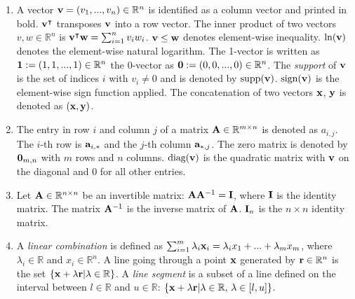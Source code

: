 \begin{enumerate}
    
    \item A vector $\bold{v} = (v_1, ..., v_n) \in \mathbb{R}^n$ is identified as a column vector and printed in bold. $\bold v^\intercal$ transposes $\bold v$ into a row vector. The inner product of two vectors $v, w \in \mathbb{R}^n$ is $\bold v^\intercal \bold w = \sum_{i=1}^n v_i w_i$. $\bold v \leq \bold w$ denotes element-wise inequality. $\ln (\bold v)$ denotes the element-wise natural logarithm. 
    The 1-vector is written as $\bold 1 := (1, 1, ..., 1) \in \mathbb{R}^n$ the 0-vector as $\bold 0 := (0, 0, ..., 0) \in \mathbb{R}^n$. The \textit{support} of $\bold{v}$ is the set of indices $i$ with $v_i \neq 0$ and is denoted by $\text{supp}(\bold v)$. $\text{sign}(\bold v)$ is the element-wise sign function applied.
    The concatenation of two vectors $\bold x$, $\bold y$ is denoted as $(\bold x, \bold y)$.

    \item The entry in row $i$ and column $j$ of a matrix $ \bold A \in \mathbb{R}^{m \times n}$ is denoted as $a_{i,j}$. The $i$-th row is $\bold a_{i,*}$ and the $j$-th column $\bold a_{*,j}$.  The zero matrix is denoted by $\bold 0_{m,n}$ with $m$ rows and $n$ columns. $\text{diag}(\bold v)$ is the quadratic matrix with $\bold v$ on the diagonal and 0 for all other entries.
    
    \item Let $\bold A \in \mathbb{R}^{n \times n}$ be an invertible matrix: $ \bold A \bold A^{-1} = \bold I$, where $\bold I$ is the identity matrix. The matrix $ \bold A^{-1}$ is the inverse matrix of $ \bold A$. %
    $\bold I_n$ is the $n \times n$ identity matrix.

    \item A \textit{linear combination} is defined as $\sum_{i=1}^{m} \lambda_i \bold x_i = 
    \lambda_i x_1 + ... + \lambda_m x_m$, where $\lambda_i \in \mathbb{R}$ and $x_i \in \mathbb{R}^n$.
    A line going through a point $\bold x$ generated by $\bold r \in \mathbb{R}^n$ is the set $\{\bold x + \lambda \bold r | \lambda \in \mathbb{R}\}$. A \textit{line segment} is a subset of a line defined on the interval between $l \in \mathbb{R}$ and $u \in \mathbb{R}$: $\{\bold x + \lambda \bold r | \lambda \in \mathbb{R}, \, \lambda \in [l, u ]\}$.


\end{enumerate}
